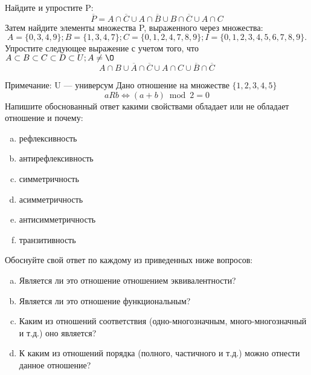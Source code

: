 \documentclass[10pt]{exam}
\begin{document}
\begin{questions}
\question
Найдите и упростите P:
\begin{equation*}
\overline{P} = A \cap \overline{C} \cup A \cap \overline{B} \cup B \cap \overline{C} \cup A \cap C
\end{equation*}
Затем найдите элементы множества P, выраженного через множества:
\begin{equation*}
A = \{0, 3, 4, 9\}; 
B = \{1, 3, 4, 7\};
C = \{0, 1, 2, 4, 7, 8, 9\};
I = \{0, 1, 2, 3, 4, 5, 6, 7, 8, 9\}.
\end{equation*}\question
Упростите следующее выражение с учетом того, что $A\subset B \subset C \subset D \subset U; A \neq \O$
\begin{equation*}
A \cap B \cup \overline{A} \cap \overline{C} \cup A \cap C \cup \overline{B} \cap \overline{C}
\end{equation*}

Примечание: U — универсум\question
Дано отношение на множестве $\{1, 2, 3, 4, 5\}$ 
\begin{equation*}
aRb \iff (a+b) \bmod 2 =0
\end{equation*}
Напишите обоснованный ответ какими свойствами обладает или не обладает отношение и почему:   
\begin{enumerate} [a)]\setcounter{enumi}{0}
\item рефлексивность
\item антирефлексивность
\item симметричность
\item асимметричность
\item антисимметричность
\item транзитивность
\end{enumerate}

Обоснуйте свой ответ по каждому из приведенных ниже вопросов:
\begin{enumerate} [a)]\setcounter{enumi}{0}
    \item Является ли это отношение отношением эквивалентности?
    \item Является ли это отношение функциональным?
    \item Каким из отношений соответствия (одно-многозначным, много-многозначный и т.д.) оно является?
    \item К каким из отношений порядка (полного, частичного и т.д.) можно отнести данное отношение?
\end{enumerate}




\end{questions}
\end{document}
